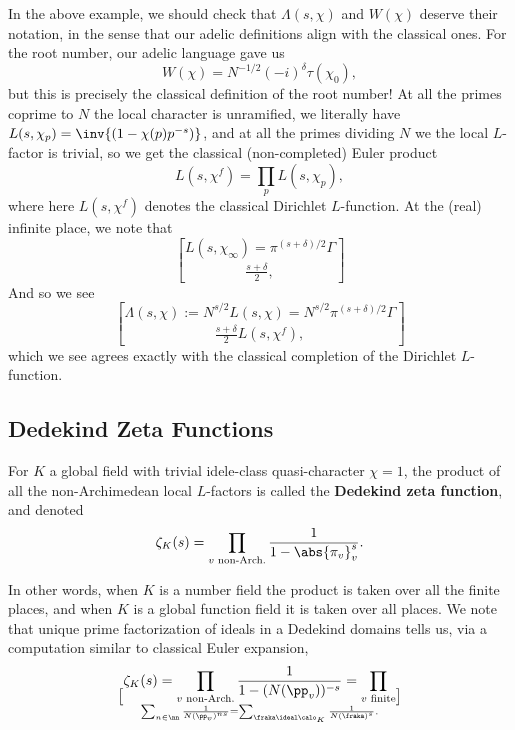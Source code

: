 \documentclass[11pt, x11names, openany]{book}
\begin{document}
\begin{sanitycheck}
In the above example, we should check that $\Lambda(s, \chi)$ and $W(\chi)$ deserve their notation, in the sense that our adelic definitions align with the classical ones. For the root number, our adelic language gave us
\begin{equation*}
    W(\chi) = N^{-1/2} (-i)^\delta \tau(\chi_0),
\end{equation*}
but this is precisely the classical definition of the root number! At all the primes coprime to $N$ the local character is unramified, we literally have $L(s, \chi_p) = \inv{(1 - \chi(p)p^{-s})}$, and at all the primes dividing $N$ we the local $L$-factor is trivial, so we get the classical (non-completed) Euler product
\begin{equation*}
    L(s, \chi^f) = \prod_p L(s, \chi_p),
\end{equation*}
where here $L(s, \chi^f)$ denotes the classical Dirichlet $L$-function.
At the (real) infinite place, we note that
\begin{equation*}
    L(s, \chi_\infty) = \pi^{(s + \delta)/2} \Gamma \brack{\frac{s + \delta}{2}},
\end{equation*}
And so we see
\begin{equation*}
    \Lambda(s, \chi) := N^{s/2} L(s, \chi) = N^{s/2} \pi^{(s + \delta)/2} \Gamma \brack{\frac{s + \delta}{2}} L(s, \chi^f),
\end{equation*} 
which we see agrees exactly with the classical completion of the Dirichlet $L$-function.
\end{sanitycheck}


\subsection{Dedekind Zeta Functions}
\label{subsection: dedekind zeta function}


\begin{defn}
\label{def: dedekind zeta function}
For $K$ a global field with trivial idele-class quasi-character $\chi = 1$, the product of all the non-Archimedean local $L$-factors is called the \textbf{Dedekind zeta function}, and denoted
\begin{equation*}
    \zeta_K(s) = \prod_{v \text{ non-Arch.}} \frac{1}{1 - \abs{\pi_v}_v^s}.
\end{equation*}
\end{defn}


In other words, when $K$ is a number field the product is taken over all the finite places, and when $K$ is a global function field it is taken over all places.  We note that unique prime factorization of ideals in a Dedekind domains tells us, via a computation similar to classical Euler expansion,
\begin{equation}
        \label{eqn: Dedekind zeta func Euler expansion}
        \zeta_K(s) = \prod_{v \text{ non-Arch.}} \frac{1}{1 - (N(\pp_v))^{-s}} = \prod_{v \text{ finite}} \brack{\sum_{n \in \nn} \frac{1}{N(\pp_v)^{ns}}} = \sum_{\fraka \ideal \calo_K} \frac{1}{N(\fraka)^s}. 
\end{equation}
\end{document}
